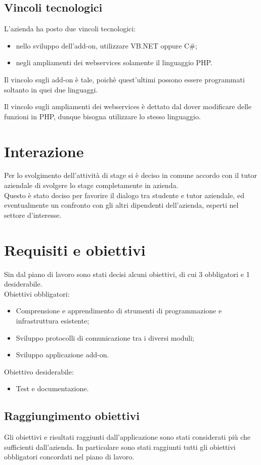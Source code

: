 \subsection{Vincoli tecnologici}
L'azienda ha posto due vincoli tecnologici:
\begin{itemize}
	\item nello sviluppo dell'add-on, utilizzare VB.NET oppure C\#;
	\item negli ampliamenti dei webservices solamente il linguaggio PHP.
\end{itemize}
Il vincolo sugli add-on è tale, poichè quest'ultimi possono essere programmati soltanto in quei due linguaggi.

Il vincolo sugli ampliamenti dei webservices è dettato dal dover modificare delle funzioni in PHP, dunque bisogna utilizzare lo stesso linguaggio.
\section{Interazione}
Per lo svolgimento dell'attività di stage si è deciso in comune accordo con il tutor aziendale di svolgere lo stage completamente in azienda.\\
Questo è stato deciso per favorire il dialogo tra studente e tutor aziendale, ed eventualmente un confronto con gli altri dipendenti dell'azienda, esperti nel settore d'interesse.
\section{Requisiti e obiettivi}
Sin dal piano di lavoro sono stati decisi alcuni obiettivi, di cui 3 obbligatori e 1 desiderabile.
\\Obiettivi obbligatori:
\begin{itemize}
	\item Comprensione e apprendimento di strumenti di programmazione e infrastruttura esistente;
	\item Sviluppo protocolli di comunicazione tra i diversi moduli;
	\item Sviluppo applicazione add-on.
\end{itemize}
Obiettivo desiderabile:
\begin{itemize}
	\item Test e documentazione.
\end{itemize}
\subsection{Raggiungimento obiettivi}
Gli obiettivi e risultati raggiunti dall'applicazione sono stati considerati più che sufficienti dall'azienda.
In particolare sono stati raggiunti tutti gli obiettivi obbligatori concordati nel piano di lavoro.


